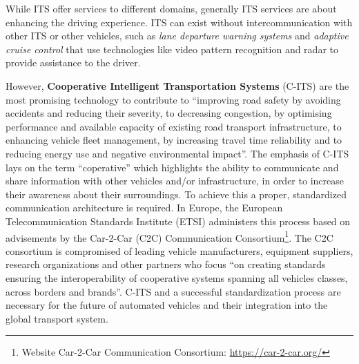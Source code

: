 While ITS offer services to different domains, generally ITS services are about enhancing the driving experience. ITS can exist without intercommunication with other ITS or other vehicles, such as \textit{lane departure warning systems} and \textit{adaptive cruise control} that use technologies like video pattern recognition and radar to provide assistance to the driver.

However, \textbf{Cooperative Intelligent Transportation Systems} (C-ITS) are the most promising technology to contribute to ``improving road safety by avoiding accidents and reducing their severity, to decreasing congestion, by optimising performance and available capacity of existing road transport infrastructure, to enhancing vehicle fleet management, by increasing travel time reliability and to reducing energy use and negative environmental impact''.
The emphasis of C-ITS lays on the term ``coperative'' which highlights the ability to communicate and share information with other vehicles and/or infrastructure, in order to increase their awareness about their surroundings.
To achieve this a proper, standardized communication architecture is required. In Europe, the European Telecommunication Standards Institute (ETSI) administers this process based on advisements by the Car-2-Car (C2C) Communication Consortium\footnote{Website Car-2-Car Communication Consortium: \url{https://car-2-car.org/}}.
The C2C consortium is compromised of leading vehicle manufacturers, equipment suppliers, research organizations and other partners who focus ``on creating standards ensuring the interoperability of cooperative systems spanning all vehicles classes, across borders and brands''\cite{}. %
C-ITS and a successful standardization process are necessary for the future of automated vehicles and their integration into the global transport system.





